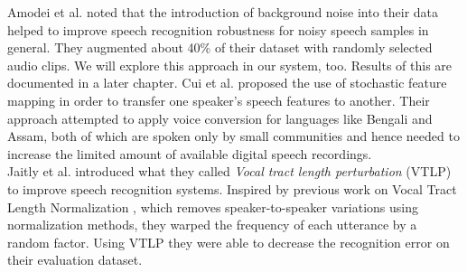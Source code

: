Amodei et al. noted that the introduction of background noise into their data helped to improve speech recognition robustness for noisy speech samples in general.\cite{amodei2015deep} They augmented about 40\% of their dataset with randomly selected audio clips. We will explore this approach in our system, too. Results of this are documented in a later chapter. Cui et al. proposed the use of stochastic feature mapping in order to transfer one speaker's speech features to another.\cite{cui2015data} Their approach attempted to apply voice conversion for languages like Bengali and Assam, both of which are spoken only by small communities and hence needed to increase the limited amount of available digital speech recordings.\\ 
Jaitly et al.\cite{jaitly2013vocal} introduced what they called \emph{Vocal tract length perturbation} (VTLP) to improve speech recognition systems. Inspired by previous work on Vocal Tract Length Normalization \cite{eide1996parametric}, which removes speaker-to-speaker variations using normalization methods, they warped the frequency of each utterance by a random factor. Using VTLP they were able to decrease the recognition error on their evaluation dataset.

       